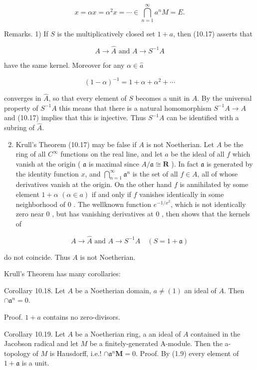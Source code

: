 \documentclass{standalone}
\theoremstyle{definition}
\theoremstyle{remark}
\begin{document}
\[
x=\alpha x=\alpha^{2} x=\cdots \in \bigcap_{n=1}^{\infty} a^{n} M=E .
\]

Remarks. 1) If $S$ is the multiplicatively closed set $1+a$, then (10.17) asserts that

\[
A \rightarrow \hat{A} \text { and } A \rightarrow S^{-1} A
\]

have the same kernel. Moreover for any $\alpha \in \hat{a}$

\[
(1-\alpha)^{-1}=1+\alpha+\alpha^{2}+\cdots
\]

converges in $\hat{A}$, so that every element of $S$ becomes a unit in $\hat{A}$. By the universal property of $S^{-1} A$ this means that there is a natural homomorphism $S^{-1} A \rightarrow A$ and (10.17) implies that this is injective. Thus $S^{-1} A$ can be identified with a subring of $\hat{A}$.

\begin{enumerate}
  \setcounter{enumi}{1}
  \item Krull's Theorem (10.17) may be false if $A$ is not Noetherian. Let $A$ be the ring of all $C^{\infty}$ functions on the real line, and let $a$ be the ideal of all $f$ which vanish at the origin ( $\mathfrak{a}$ is maximal since $A / \mathfrak{a} \cong \mathbf{R}$ ). In fact $\mathfrak{a}$ is generated by the identity function $x$, and $\bigcap_{n=1}^{\infty} \mathfrak{a}^{n}$ is the set of all $f \in A$, all of whose derivatives vanish at the origin. On the other hand $f$ is annihilated by some element $1+\alpha$ $(\alpha \in a)$ if and only if $f$ vanishes identically in some neighborhood of 0 . The wellknown function $e^{-1 / x^{2}}$, which is not identically zero near 0 , but has vanishing derivatives at 0 , then shows that the kernels of
\end{enumerate}

\[
A \rightarrow \hat{A} \text { and } A \rightarrow S^{-1} A \quad(S=1+\mathfrak{a})
\]

do not coincide. Thus $A$ is not Noetherian.

Krull's Theorem has many corollaries:

Corollary 10.18. Let $A$ be a Noetherian domain, $a \neq(1)$ an ideal of $A$. Then $\cap \mathfrak{a}^{n}=0$.

Proof. $1+a$ contains no zero-divisors.

Corollary 10.19. Let $A$ be a Noetherian ring, a an ideal of $A$ contained in the Jacobson radical and let $M$ be a finitely-generated A-module. Then the a-topology of $M$ is Hausdorff, i.e.! $\cap \mathfrak{a}^{n} \boldsymbol{M}=0$. Proof. By (1.9) every element of $1+\mathfrak{a}$ is a unit.
\end{document}
